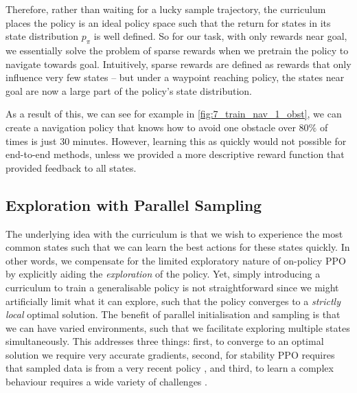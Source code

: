Therefore, rather than waiting for a lucky sample trajectory, the curriculum places the policy is an ideal policy space such that the return for states in its state distribution $p_\pi$ is well defined. So for our task, with only rewards near goal, we essentially solve the problem of sparse rewards when we pretrain the policy to navigate towards goal. Intuitively, sparse rewards are defined as rewards that only influence very few states -- but under a waypoint reaching policy, the states near goal are now a large part of the policy's state distribution. 

As a result of this, we can see for example in \cref{fig:7_train_nav_1_obst}, we can create a navigation policy that knows how to avoid one obstacle over $80\%$ of times is just 30 minutes. However, learning this as quickly would not possible for end-to-end methods, unless we provided a more descriptive reward function that provided feedback to all states.


\subsection{Exploration with Parallel Sampling}
\label{subsec:9_parallel_sampling}
The underlying idea with the curriculum is that we wish to experience the most common states such that we can learn the best actions for these states quickly. In other words, we compensate for the limited exploratory nature of on-policy PPO by explicitly aiding the \textit{exploration} of the policy. Yet, simply introducing a curriculum to train a generalisable policy is not straightforward since we might artificially limit what it can explore, such that the policy converges to a \textit{strictly local} optimal solution. The benefit of parallel initialisation and sampling is that we can have varied environments, such that we facilitate exploring multiple states simultaneously. This addresses three things: first, to converge to an optimal solution we require very accurate gradients, second, for stability PPO requires that sampled data is from a very recent policy \cite{batchsizeInvariance}, and third, to learn a complex behaviour requires a wide variety of challenges \cite{RichEnvironments}.

